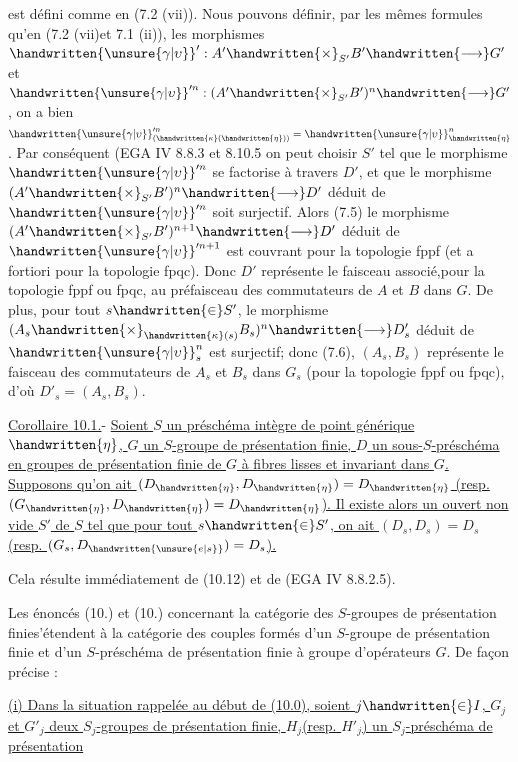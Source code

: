 est défini comme en (7.2 (vii)). Nous pouvons définir, par les mêmes formules qu'en (7.2 (vii)et 7.1 (ii)), les morphismes $\handwritten{\unsure{\gamma|\upsilon}}':A'\handwritten{\times}_{S'}B'\handwritten{\longrightarrow}G'$ et $\handwritten{\unsure{\gamma|\upsilon}}'^n:(A'\handwritten{\times}_{S'}B')^n\handwritten{\longrightarrow}G'$, on a bien $\handwritten{\unsure{\gamma|\upsilon}}'^n_{(\handwritten{\kappa}(\handwritten{\eta}))}=\handwritten{\unsure{\gamma|\upsilon}}^n_{\handwritten{\eta}}$. Par conséquent (EGA IV 8.8.3 et 8.10.5\deleted{)}\handwritten{,} on peut choisir $S'$ tel que le morphisme $\handwritten{\unsure{\gamma|\upsilon}}'^n$ se factorise à travers $D'$, et que le morphisme $(A'\handwritten{\times}_{S'}B')^n\handwritten{\longrightarrow}D'$ déduit de $\handwritten{\unsure{\gamma|\upsilon}}'^n$ soit surjectif. Alors (7.5) le morphisme $(A'\handwritten{\times}_{S'}B')^{n+1}\handwritten{\longrightarrow}D'$ déduit de $\handwritten{\unsure{\gamma|\upsilon}}'^{n+1}$ est couvrant pour la topologie fppf (et a fortiori pour la topologie fpqc). Donc $D'$ représente le faisceau associé,pour la topologie fppf ou fpqc, au préfaisceau des commutateurs de $A$ et $B$ dans $G$. De plus, pour tout $s\handwritten{\in}S'$, le morphisme $(A_s\handwritten{\times}_{\handwritten{\kappa}(s)}B_s)^n\handwritten{\longrightarrow}D'_s$ déduit de $\handwritten{\unsure{\gamma|\upsilon}}^n_s$ est surjectif; donc (7.6), $(A_s,B_s)$ représente le faisceau des commutateurs de $A_s$ et $B_s$ dans $G_s$ (pour la topologie fppf ou fpqc), d'où $D'_s=(A_s,B_s)$.

\uline{Corollaire 10.1.}- \uline{Soient $S$ un préschéma intègre de point générique $\handwritten{\eta}$, $G$ un $S$-groupe de présentation finie, $D$ un sous-$S$-préschéma en groupes de présentation finie de $G$ à fibres lisses et invariant dans $G$. Supposons qu'on ait $(D_{\handwritten{\eta}},D_{\handwritten{\eta}})=D_{\handwritten{\eta}}$ (resp. $(G_{\handwritten{\eta}},D_{\handwritten{\eta}})=D_{\handwritten{\eta}}$). Il existe alors un ouvert non vide $S'$ de $S$ tel que pour tout $s\handwritten{\in}S'$, on ait $(D_s,D_s)=D_s$ (resp. $(G_s,D_{\handwritten{\unsure{e|s}}})=D_s$).}

Cela résulte immédiatement de (10.12) et de (EGA IV 8.8.2.5).

Les énoncés (10.) et (10.) concernant la catégorie des $S$-groupes de présentation finie\handwritten{[}s'étendent à la catégorie des couples formés d'un $S$-groupe de présentation finie et d'un  $S$-préschéma de présentation finie à groupe d'opérateurs $G$. De façon précise :

 \uline{(i) Dans la situation rappelée au début de (10.0), soient $j\handwritten{\in}I$, $G_j$ et $G'_j$ deux $S_j$-groupes de présentation finie, $H_j$(resp. $H'_j$) un $S_j$-préschéma de présentation}
